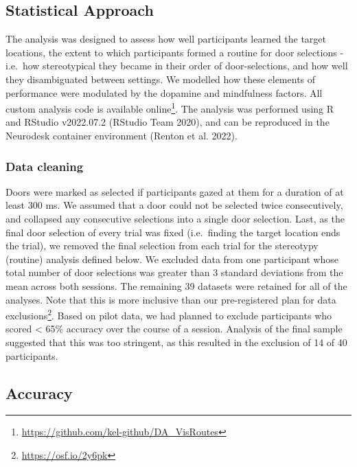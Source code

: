 \documentclass{article}
\begin{document}
\hypertarget{statistical-approach}{%
\subsection{Statistical Approach}\label{statistical-approach}}

The analysis was designed to assess how well participants learned the
target locations, the extent to which participants formed a routine for
door selections - i.e.~how stereotypical they became in their order of
door-selections, and how well they disambiguated between settings. We
modelled how these elements of performance were modulated by the
dopamine and mindfulness factors. All custom analysis code is available
online\footnote{\url{https://github.com/kel-github/DA_VisRoutes}}. The
analysis was performed using R and RStudio v2022.07.2 (RStudio Team
2020), and can be reproduced in the Neurodesk container environment
(Renton et al. 2022).

\hypertarget{data-cleaning}{%
\subsubsection{Data cleaning}\label{data-cleaning}}

Doors were marked as selected if participants gazed at them for a
duration of at least 300 ms. We assumed that a door could not be
selected twice consecutively, and collapsed any consecutive selections
into a single door selection. Last, as the final door selection of every
trial was fixed (i.e.~finding the target location ends the trial), we
removed the final selection from each trial for the stereotypy (routine)
analysis defined below. We excluded data from one participant whose
total number of door selections was greater than 3 standard deviations
from the mean across both sessions. The remaining 39 datasets were
retained for all of the analyses. Note that this is more inclusive than
our pre-registered plan for data exclusions\footnote{\url{https://osf.io/2y6pk}}.
Based on pilot data, we had planned to exclude participants who scored
\textless{} 65\% accuracy over the course of a session. Analysis of the
final sample suggested that this was too stringent, as this resulted in
the exclusion of 14 of 40 participants.

\hypertarget{accuracy}{%
\subsection{Accuracy}\label{accuracy}}
\end{document}
